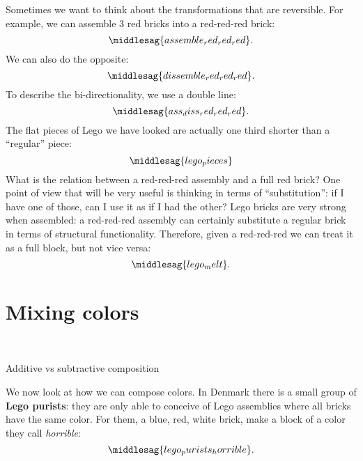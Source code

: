 Sometimes we want to think about the transformations that are reversible.
For example, we can assemble 3 red bricks into a red-red-red brick:
%
\begin{equation*}
    \middlesag{assemble_red_red_red}.
\end{equation*}
%
We can also do the opposite:
%
\begin{equation*}
    \middlesag{dissemble_red_red_red}.
\end{equation*}
%
To describe the bi-directionality, we use a double line:
%
\begin{equation*}
    \middlesag{ass_diss_red_red_red}.
\end{equation*}
%
The flat pieces of Lego we have looked are actually one third shorter than a ``regular'' piece:
%
\begin{equation*}
    \middlesag{lego_pieces}
\end{equation*}
%
What is the relation between a red-red-red assembly and a full red brick?
One point of view that will be very useful is thinking in terms of ``substitution'': if I have one of those, can I use it as if I had the other?
Lego bricks are very strong when assembled: a red-red-red assembly can certainly substitute a regular brick in terms of structural functionality.
Therefore, given a red-red-red we can treat it as a full block, but not vice versa:
%
\begin{equation*}
    \middlesag{lego_melt}.
\end{equation*}

\section{Mixing colors}

\begin{marginfigure}
    \centering
    \\
    \caption{Additive vs subtractive composition}
\end{marginfigure}

We now look at how we can compose colors.
In Denmark there is a small group of \textbf{Lego purists}: they are only able to conceive of Lego assemblies where all bricks have the same color.
For them, a blue, red, white brick, make a block of a color they call \emph{horrible}:
%
\begin{equation*}
    \middlesag{lego_purists_horrible}.
\end{equation*}

